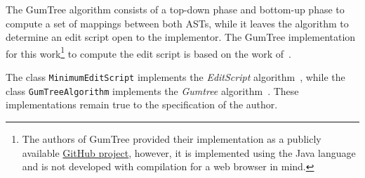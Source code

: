 The GumTree algorithm consists of a top-down phase and bottom-up phase to compute a set of mappings between both ASTs,
while it leaves the algorithm to determine an edit script open to the implementor.
The GumTree implementation for this work\footnote{
    The authors of GumTree provided their implementation as a publicly available
    \href{https://github.com/GumTreeDiff/gumtree}{GitHub project}, however, it is implemented using the Java language and is
    not developed with compilation for a web browser in mind.}
to compute the edit script is based on the work of~\citet{10.1145/235968.233366}.

The class \texttt{MinimumEditScript} implements the \emph{EditScript} algorithm~\cite{10.1145/235968.233366},
while the class \texttt{GumTreeAlgorithm} implements the \emph{Gumtree}
algorithm~\cite{10.1145/2642937.2642982}.
These implementations remain true to the specification of the author.
